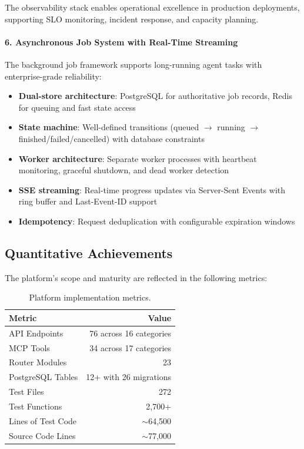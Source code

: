 The observability stack enables operational excellence in production deployments, supporting SLO monitoring, incident response, and capacity planning.

\paragraph{6. Asynchronous Job System with Real-Time Streaming}

The background job framework supports long-running agent tasks with enterprise-grade reliability:

\begin{itemize}
    \item \textbf{Dual-store architecture}: PostgreSQL for authoritative job records, Redis for queuing and fast state access
    \item \textbf{State machine}: Well-defined transitions (queued $\rightarrow$ running $\rightarrow$ finished/failed/cancelled) with database constraints
    \item \textbf{Worker architecture}: Separate worker processes with heartbeat monitoring, graceful shutdown, and dead worker detection
    \item \textbf{SSE streaming}: Real-time progress updates via Server-Sent Events with ring buffer and Last-Event-ID support
    \item \textbf{Idempotency}: Request deduplication with configurable expiration windows
\end{itemize}

\subsection{Quantitative Achievements}

The platform's scope and maturity are reflected in the following metrics:

\begin{table}[ht]
\centering
\caption{Platform implementation metrics.}
\label{tab:implementation-metrics}
\begin{tabular}{lr}
\hline
\textbf{Metric} & \textbf{Value} \\
\hline
API Endpoints & 76 across 16 categories \\
MCP Tools & 34 across 17 categories \\
Router Modules & 23 \\
PostgreSQL Tables & 12+ with 26 migrations \\
Test Files & 272 \\
Test Functions & 2,700+ \\
Lines of Test Code & $\sim$64,500 \\
Source Code Lines & $\sim$77,000 \\
\hline
\end{tabular}
\end{table}

